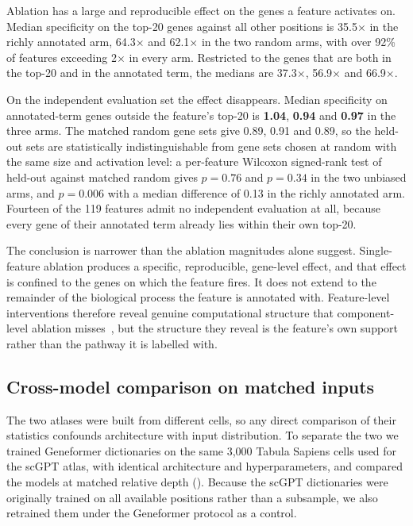 \documentclass[onecolumn,11pt]{article}
\begin{document}
Ablation has a large and reproducible effect on the genes a feature activates on. Median
specificity on the top-20 genes against all other positions is 35.5$\times$ in the richly annotated
arm, 64.3$\times$ and 62.1$\times$ in the two random arms, with over 92\% of features exceeding
2$\times$ in every arm. Restricted to the genes that are both in the top-20 and in the annotated
term, the medians are 37.3$\times$, 56.9$\times$ and 66.9$\times$.

On the independent evaluation set the effect disappears. Median specificity on annotated-term genes
outside the feature's top-20 is \textbf{1.04}, \textbf{0.94} and \textbf{0.97} in the three arms.
The matched random gene sets give 0.89, 0.91 and 0.89, so the held-out sets are statistically
indistinguishable from gene sets chosen at random with the same size and activation level: a
per-feature Wilcoxon signed-rank test of held-out against matched random gives $p = 0.76$ and
$p = 0.34$ in the two unbiased arms, and $p = 0.006$ with a median difference of 0.13 in the richly
annotated arm. Fourteen of the 119 features admit no independent evaluation at all, because every
gene of their annotated term already lies within their own top-20.

The conclusion is narrower than the ablation magnitudes alone suggest. Single-feature ablation
produces a specific, reproducible, gene-level effect, and that effect is confined to the genes on
which the feature fires. It does not extend to the remainder of the biological process the feature
is annotated with. Feature-level interventions therefore reveal genuine computational structure
that component-level ablation misses~\cite{kendiukhov2025systematic}, but the structure they reveal
is the feature's own support rather than the pathway it is labelled with.


\subsection*{Cross-model comparison on matched inputs}
\label{sec:crossmodel}

The two atlases were built from different cells, so any direct comparison of their statistics
confounds architecture with input distribution. To separate the two we trained Geneformer
dictionaries on the same 3,000 Tabula Sapiens cells used for the scGPT atlas, with identical
architecture and hyperparameters, and compared the models at matched relative depth
(). Because the scGPT dictionaries were originally trained on all available
positions rather than a subsample, we also retrained them under the Geneformer protocol as a
control.
\end{document}
